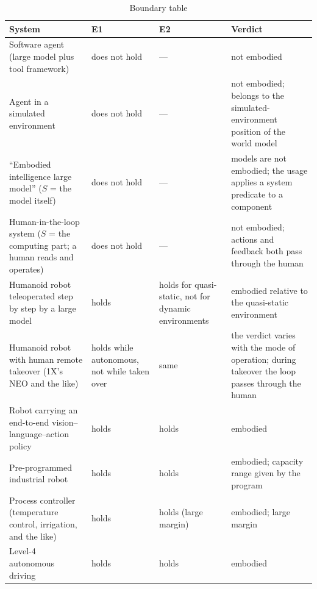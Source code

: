 \documentclass[10pt]{article}
\begin{document}
\begin{table}[htbp]
\centering
\caption{Boundary table}
\label{tab:boundary}
\small
\begin{tabularx}{\textwidth}{>{\raggedright\arraybackslash}p{5.2cm}>{\raggedright\arraybackslash}p{3.0cm}>{\raggedright\arraybackslash}p{2.2cm}Y}
\toprule
System & E1 & E2 & Verdict \\
\midrule
Software agent (large model plus tool framework) & does not hold & --- & not embodied \\
Agent in a simulated environment & does not hold & --- & not embodied; belongs to the simulated-environment position of the world model \\
``Embodied intelligence large model'' ($S$ = the model itself) & does not hold & --- & models are not embodied; the usage applies a system predicate to a component \\
Human-in-the-loop system ($S$ = the computing part; a human reads and operates) & does not hold & --- & not embodied; actions and feedback both pass through the human \\
Humanoid robot teleoperated step by step by a large model & holds & holds for quasi-static, not for dynamic environments & embodied relative to the quasi-static environment \\
Humanoid robot with human remote takeover (1X's NEO and the like) & holds while autonomous, not while taken over & same & the verdict varies with the mode of operation; during takeover the loop passes through the human \\
Robot carrying an end-to-end vision--language--action policy & holds & holds & embodied \\
Pre-programmed industrial robot & holds & holds & embodied; capacity range given by the program \\
Process controller (temperature control, irrigation, and the like) & holds & holds (large margin) & embodied; large margin \\
Level-4 autonomous driving & holds & holds & embodied \\
\bottomrule
\end{tabularx}
\end{table}
\end{document}
